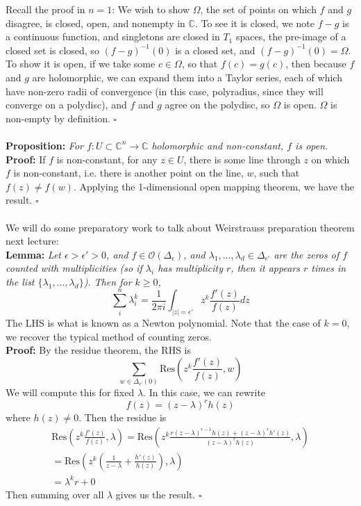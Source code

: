 \documentclass[12pt]{report}
\theoremstyle{definition}
\theoremstyle{remark}
\numberwithin{equation}{section}
\theoremstyle{definition}
\newcommand{\inv}[1]{#1^{-1}}
\newcommand{\bb}[1]{\mathbb{#1}}
\newcommand{\mqed}{\hfill\newline\null \hfill$\square$\\ }
\begin{document}
Recall the proof in $n = 1$: We wish to show $\Omega$, the set of points on which $f$ and $g$ disagree, is closed, open, and nonempty in $\bb C$. To see it is closed, we note $f-g$ is a continuous function, and singletons are closed in $T_1$ spaces, the pre-image of a closed set is closed, so $\inv{(f-g)}(0)$ is a closed set, and $\inv{(f-g)}(0) = \Omega$. To show it is open, if we take some $c \in \Omega$, so that $f(c) = g(c)$, then because $f$ and $g$ are holomorphic, we can expand them into a Taylor series, each of which have non-zero radii of convergence (in this case, polyradius, since they will converge on a polydisc), and $f$ and $g$ agree on the polydisc, so $\Omega$ is open. $\Omega$ is non-empty by definition. \mqed\\
\textbf{Proposition: }\textit{For $f: U \subset \bb C^n \to \bb C$ holomorphic and non-constant, $f$ is open. }\\
\textbf{Proof: } If $f$ is non-constant, for any $z \in U$, there is some line through $z$ on which $f$ is non-constant, i.e. there is another point on the line, $w$, such that $f(z) \ne f(w)$. Applying the 1-dimensional open mapping theorem, we have the result. \mqed\\
We will do some preparatory work to talk about Weirstrauss preparation theorem next lecture:\\
\textbf{Lemma: }\textit{Let $\epsilon > \epsilon' > 0$, and $f \in \mathcal{O}(\Delta_\epsilon)$, and $\lambda_1,\dots,\lambda_d \in \Delta_{\epsilon'}$ are the zeros of $f$ counted with multiplicities (so if $\lambda_i$ has multiplicity $r$, then it appears $r$ times in the list $\{\lambda_1,\dots,\lambda_d\}$). Then for $k \geq 0$,}
$$
	\sum_i^n \lambda_i^k = \frac{1}{2\pi i} \int_{|z| = \epsilon'} z^k \frac{f'(z)}{f(z)} dz 
$$
The LHS is what is known as a Newton polynomial. Note that the case of $k = 0$, we recover the typical method of counting zeros.  \\
\textbf{Proof: }By the residue theorem, the RHS is 
$$
	\sum_{w \in \Delta_{\epsilon'}(0)} \text{Res}\left(z^k\frac{f'(z)}{f(z)},w\right)
$$
We will compute this for fixed $\lambda$. In this case, we can rewrite
$$
	f(z) = (z-\lambda)^r h(z)
$$ 
where $h(z) \ne 0$. Then the residue is 
\begin{gather*}
	\text{Res}\left(z^k \frac{f'(z)}{f(z)},\lambda\right) = \text{Res}\left(z^k\frac{r(z-\lambda)^{r-1}h(z) + (z-\lambda)^rh'(z)}{(z-\lambda)^rh(z)},\lambda\right)\\
= \text{Res}\left(z^k\left(\frac{1}{z-\lambda} + \frac{h'(z)}{h(z)}\right),\lambda\right)\\
= \lambda^kr + 0 
\end{gather*}
Then summing over all $\lambda$ gives us the result. 
\mqed
\end{document}
